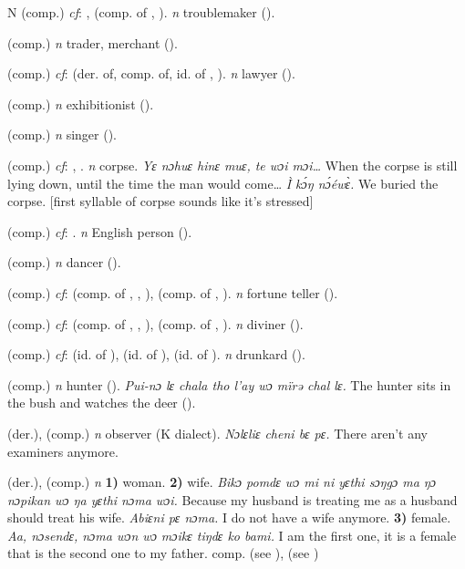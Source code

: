\begin{letter}{N}
 (comp.) \textit{cf}: ,  (comp. of , ). \textit{n} troublemaker (\citealt{Pichl1967}).

 (comp.) \textit{n} trader, merchant (\citealt{Pichl1967}).

 (comp.) \textit{cf}:  (der. of, comp. of, id. of , ). \textit{n} lawyer (\citealt{Pichl1967}).

 (comp.) \textit{n} exhibitionist (\citealt{Pichl1967}).

 (comp.) \textit{n} singer (\citealt{Pichl1967}).

 (comp.) \textit{cf}: , . \textit{n} corpse. \textit{Yɛ nɔhuɛ hinɛ muɛ, te wɔi mɔi…} When the corpse is still lying down, until the time the man would come… \textit{Ì kɔ́ŋ nɔ́éwɛ̀.} We buried the corpse. [first syllable of corpse sounds like it's stressed]

 (comp.) \textit{cf}: . \textit{n} English person (\citealt{Pichl1967}).

 (comp.) \textit{n} dancer (\citealt{Pichl1967}).

 (comp.) \textit{cf}:  (comp. of , , ),  (comp. of , ). \textit{n} fortune teller (\citealt{Pichl1967}).

 (comp.) \textit{cf}:  (comp. of , , ),  (comp. of , ). \textit{n} diviner (\citealt{Pichl1967}).

 (comp.) \textit{cf}:  (id. of ),  (id. of ),  (id. of ). \textit{n} drunkard (\citealt{Pichl1967}).

 (comp.) \textit{n} hunter (\citealt{Pichl1967}). \textit{Pui-nɔ lɛ chala tho l'ay wɔ mïrə chal lɛ.} The hunter sits in the bush and watches the deer (\citealt{Pichl1967}).

 (der.), (comp.) \textit{n} observer (K dialect). \textit{Nɔlɛliɛ cheni bɛ pɛ.} There aren't any examiners anymore. 

 (der.), (comp.) \textit{n} \textbf{1)} woman. \textbf{2)} wife. \textit{Bikɔ pomdɛ wɔ mi ni yɛthi sɔŋgɔ ma ŋɔ nɔpikan wɔ ŋa yɛthi nɔma wɔi.} Because my husband is treating me as a husband should treat his wife. \textit{Abiɛni pɛ nɔma.} I do not have a wife anymore. \textbf{3)} female. \textit{Aa, nɔsendɛ, nɔma wɔn wɔ mɔikɛ tiŋdɛ ko bami.} I am the first one, it is a female that is the second one to my father. comp.  (see ),  (see ) 


\end{letter}
